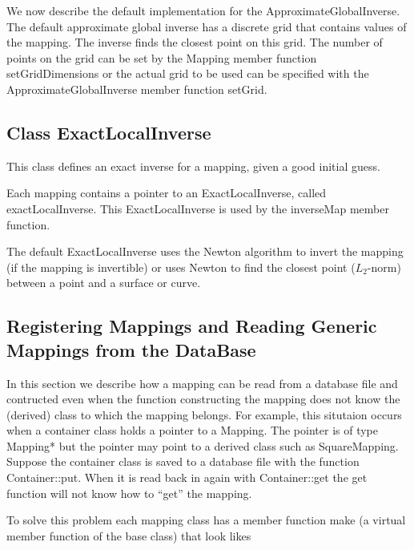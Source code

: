 \documentclass[xcolor=rgb,svgnames,dvipsnames]{article}
\begin{document}
We now describe the default implementation for the ApproximateGlobalInverse.
The default approximate global inverse has a discrete grid that contains
values of the mapping. The inverse finds the closest point on this grid.
The number of points on the grid can be set by the Mapping
member function {\ff setGridDimensions}
or the actual grid to be used can be specified with the ApproximateGlobalInverse
member function {\ff setGrid}. 



\subsection{Class ExactLocalInverse}

This class defines an exact inverse for a mapping, given a good initial guess.

Each mapping contains a pointer to an ExactLocalInverse, called
{\ff exactLocalInverse}.
This ExactLocalInverse is used by the {\ff inverseMap} member function.

The default ExactLocalInverse uses the Newton algorithm to invert the
mapping (if the mapping is invertible) or uses Newton to find the
closest point ($L_2$-norm) between a point and a surface or curve.





\subsection{Registering Mappings and Reading Generic Mappings from the DataBase}

In this section we describe how a mapping can be read from a database file
and contructed even when the function constructing the mapping does not
know the (derived) class to which the mapping belongs. For example, this
situtaion occurs when a container class holds a pointer to a Mapping. The
pointer is of type {\ff Mapping*} but the pointer may point to a derived
class such as {\ff SquareMapping}.  Suppose the container class is saved to a 
database file with the function {\ff Container::put}. When it is read 
back in again with {\ff Container::get} the {\ff get} function will not 
know how to ``get'' the mapping.

To solve this problem each mapping class has a member function {\ff make}
(a virtual member function of the base class) that look likes
\end{document}
